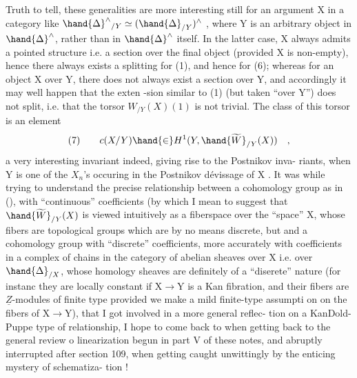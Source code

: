 
Truth to tell, these generalities are more interesting still  for
an argument X in a category like $\hand{\Delta}^{\wedge}{}_{/Y} \simeq (\hand{\Delta}_{/Y})^{\wedge}$ , where Y is an arbitrary
object in $\hand{\Delta}^{\wedge}$, rather than in $\hand{\Delta}^{\wedge}$ itself. In the latter case, X always
admits a pointed structure i.e. a section over the final object (provided
X is non-empty), hence there always exists a splitting for (1), and
hence  for (6); whereas for an object X over Y, there does not always
exist a section over Y, and accordingly it may well happen that the exten%
-sion similar to (1) (but taken ``over Y'') does not split, i.e. that the
torsor $W_{/Y}(X)(1)$ is not trivial. The class of this torsor is an element
\[ (7) \qquad c(X/Y)\hand{\in} H^1(Y, \hand{\widetilde{W}}_{/Y}(X)) \quad , \]
a very interesting invariant indeed, giving rise to the Postnikov inva-%
riants, when Y is one of the $X_n$'s occuring in the Postnikov dévissage
of X . It was while trying to understand the precise relationship between
a cohomology group as in (), with ``continuous'' coefficients (by which
I mean to suggest that $\hand{\widetilde{W}}_{/Y}(X)$ is viewed intuitively as a fiberspace over
the ``space'' X, whose fibers are topological  groups which are by no means
discrete, but  and a cohomology group
with ``discrete'' coefficients, more accurately with coefficients in a
complex of chains in the category of abelian sheaves over X i.e. over $\hand{\Delta}_{/X}$,
whose homology sheaves are definitely of a ``diserete'' nature\xout{,} (for instanc%
they are locally constant if X$\to$Y is a Kan fibration, and their fibers
are $\underline{Z}$-modules of finite type provided we make a mild finite-type assumpti%
on on the fibers of X$\to$Y), that I got involved in a more general reflec-%
tion on a Kan\hand{-}Dold-Puppe type of relationship,  I hope to come back
to  when getting back to the general review o linearization begun in part
V of these notes, and abruptly interrupted after section 109, when
getting  caught unwittingly by the enticing mystery of schematiza-%
tion !

